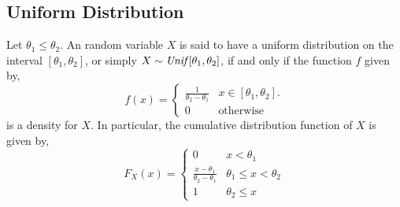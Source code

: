 \subsection{Uniform Distribution}
\begin{definition}
Let $\theta_1 \leq \theta_2$. An random variable $X$ is said to have a uniform
distribution on the interval $[\theta_1, \theta_2]$, or simply $X \sim
\text{\emph{Unif}}[\theta_1, \theta_2]$, if and only if the function $f$ given by,
\[
    f(x) = \begin{cases}
        \frac{1}{\theta_2 - \theta_1}      & x \in [\theta_1, \theta_2].     \\
        0                                  & \text{otherwise}
    \end{cases}
\]
is a density for $X$. In particular, the cumulative distribution function of
$X$ is given by,
\[
    F_X(x) = \begin{cases}
        0                                        & x < \theta_1              \\
        \frac{x - \theta_1}{\theta_2 - \theta_1} & \theta_1 \leq x < \theta_2\\
        1                                        & \theta_2 \leq x
    \end{cases}
\]
\begin{figure}[H]
    \centering
    \def\svgwidth{0.5\textwidth}
        
\end{figure}
\end{definition}

